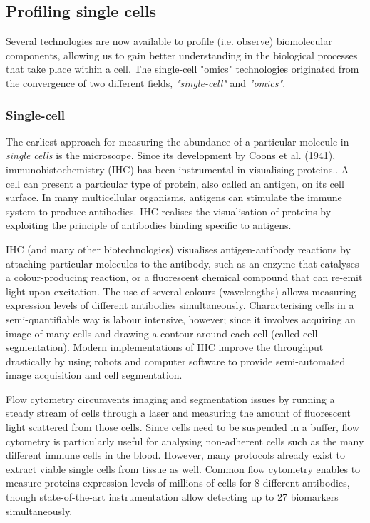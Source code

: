 
\subsection{Profiling single cells}
Several technologies are now available to profile (i.e. observe) biomolecular components, allowing us to gain better understanding in the biological processes that take place within a cell. The single-cell "omics" technologies originated from the convergence of two different fields, \emph{"single-cell"} and \emph{"omics"}.

\subsubsection{Single-cell}
The earliest approach for measuring the abundance of a particular molecule in \emph{single cells} is the microscope.
Since its development by Coons et al. (1941), immunohistochemistry (IHC) has been instrumental in visualising proteins.\cite{coons_immunologicalpropertiesantibody_1941}. 
A cell can present a particular type of protein, also called an antigen, on its cell surface. In many multicellular organisms, antigens can stimulate the immune system to produce antibodies. IHC realises the visualisation of proteins by exploiting the principle of antibodies binding specific to antigens.

IHC (and many other biotechnologies) visualises antigen-antibody reactions by attaching particular molecules to the antibody, such as an enzyme that catalyses a colour-producing reaction, or a fluorescent chemical compound that can re-emit light upon excitation. The use of several colours (wavelengths) allows measuring expression levels of different antibodies simultaneously. Characterising cells in a semi-quantifiable way is labour intensive, however; since it involves acquiring an image of many cells and drawing a contour around each cell (called cell segmentation).
Modern implementations of IHC improve the throughput drastically by using robots and computer software to provide semi-automated image acquisition and cell segmentation\cite{theodosiou_automatedanalysisfish_2007}.

Flow cytometry\cite{fulwyler_electronicseparationbiological_1965} circumvents imaging and segmentation issues by running a steady stream of cells through a laser and measuring the amount of fluorescent light scattered from those cells. 
Since cells need to be suspended in a buffer, flow cytometry is particularly useful for analysing non-adherent cells such as the many different immune cells in the blood. However, many protocols already exist to extract viable single cells from tissue as well\cite{leelatian_preparingviablesingle_2017}.
Common flow cytometry enables to measure proteins expression levels of millions of cells for 8 different antibodies, though state-of-the-art instrumentation allow detecting up to 27 biomarkers simultaneously\cite{cossarizza_guidelinesuseflow_2017}.

